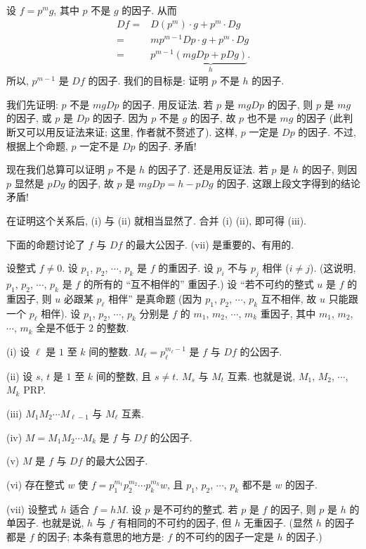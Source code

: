 \begin{pf}
    设 $f = p^m g$, 其中 $p$ 不是 $g$ 的因子. 从而
    \begin{align*}
        Df
        = {} & D(p^m) \cdot g + p^m \cdot Dg          \\
        = {} & mp^{m-1} Dp \cdot g + p^m \cdot Dg     \\
        = {} & p^{m-1} \underbrace{(mgDp + pDg)}_{h}.
    \end{align*}
    所以, $p^{m-1}$ 是 $Df$ 的因子. 我们的目标是: 证明 $p$ 不是 $h$ 的因子.

    我们先证明: $p$ 不是 $mgDp$ 的因子. 用反证法. 若 $p$ 是 $mgDp$ 的因子, 则 $p$ 是 $mg$ 的因子, 或 $p$ 是 $Dp$ 的因子. 因为 $p$ 不是 $g$ 的因子, 故 $p$ 也不是 $mg$ 的因子 (此判断又可以用反证法来证; 这里, 作者就不赘述了). 这样, $p$ 一定是 $Dp$ 的因子. 不过, 根据上个命题, $p$ 一定不是 $Dp$ 的因子. 矛盾!

    现在我们总算可以证明 $p$ 不是 $h$ 的因子了. 还是用反证法. 若 $p$ 是 $h$ 的因子, 则因 $p$ 显然是 $pDg$ 的因子, 故 $p$ 是 $mgDp = h - pDg$ 的因子. 这跟上段文字得到的结论矛盾!

    在证明这个关系后, (i) 与 (ii) 就相当显然了. 合并 (i) (ii), 即可得 (iii).
\end{pf}

下面的命题讨论了 $f$ 与 $Df$ 的最大公因子. (vii) 是重要的、有用的.

\begin{proposition}
    设整式 $f \neq 0$. 设 $p_1$, $p_2$, $\cdots$, $p_k$ 是 $f$ 的重因子. 设 $p_i$ 不与 $p_j$ 相伴 ($i \neq j$). (这说明, $p_1$, $p_2$, $\cdots$, $p_k$ 是 $f$ 的所有的 ``互不相伴的'' 重因子.) 设 ``若不可约的整式 $u$ 是 $f$ 的重因子, 则 $u$ 必跟某 $p_\ell$ 相伴'' 是真命题 (因为 $p_1$, $p_2$, $\cdots$, $p_k$ 互不相伴, 故 $u$ 只能跟一个 $p_\ell$ 相伴). 设 $p_1$, $p_2$, $\cdots$, $p_k$ 分别是 $f$ 的 $m_1$, $m_2$, $\cdots$, $m_k$ 重因子, 其中 $m_1$, $m_2$, $\cdots$, $m_k$ 全是不低于 $2$ 的整数.

    (i) 设 $\ell$ 是 $1$ 至 $k$ 间的整数. $M_\ell = p_\ell^{m_\ell - 1}$ 是 $f$ 与 $Df$ 的公因子.

    (ii) 设 $s$, $t$ 是 $1$ 至 $k$ 间的整数, 且 $s \neq t$. $M_s$ 与 $M_t$ 互素. 也就是说, $M_1$, $M_2$, $\cdots$, $M_k$ PRP.

    (iii) $M_1 M_2 \cdots M_{\ell - 1}$ 与 $M_\ell$ 互素.

    (iv) $M = M_1 M_2 \cdots M_k$ 是 $f$ 与 $Df$ 的公因子.

    (v) $M$ 是 $f$ 与 $Df$ 的最大公因子.

    (vi) 存在整式 $w$ 使 $f = p_1^{m_1} p_2^{m_2} \cdots p_k^{m_k} w$, 且 $p_1$, $p_2$, $\cdots$, $p_k$ 都不是 $w$ 的因子.

    (vii) 设整式 $h$ 适合 $f = hM$. 设 $p$ 是不可约的整式. 若 $p$ 是 $f$ 的因子, 则 $p$ 是 $h$ 的单因子. 也就是说, $h$ 与 $f$ 有相同的不可约的因子, 但 $h$ 无重因子. (显然 $h$ 的因子都是 $f$ 的因子; 本条有意思的地方是: $f$ 的不可约的因子一定是 $h$ 的因子.)
\end{proposition}

